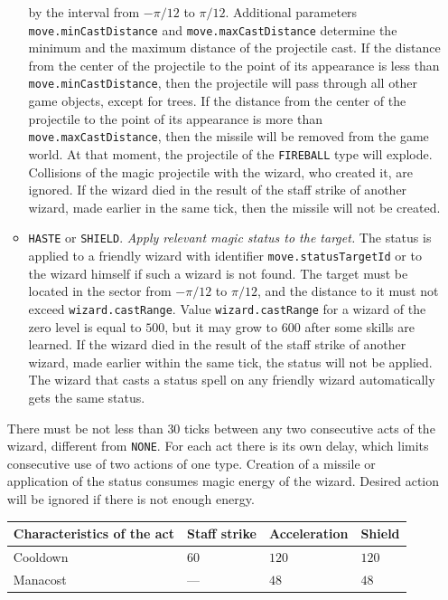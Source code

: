 \begin{itemize}
\begin{itemize}
                    by the interval from $-\pi / 12$ to $\pi / 12$. Additional parameters \texttt{move.minCastDistance} and
                    \texttt{move.maxCastDistance} determine the minimum and the maximum distance of the projectile cast. If the distance from the center
                    of the projectile to the point of its appearance is less than \texttt{move.minCastDistance}, then the projectile will pass through all
                    other game objects, except for trees. If the distance from the center of the projectile to the point of its appearance is more than
                    \texttt{move.maxCastDistance}, then the missile will be removed from the game world. At that moment, the projectile of the \texttt{FIREBALL} type will explode.
                    Collisions of the magic projectile with the wizard, who created it, are ignored. If the wizard died in the result of the staff strike
                    of another wizard, made earlier in the same tick, then the missile will not be created.
            \item \texttt{HASTE} or \texttt{SHIELD}. \textit{Apply relevant magic status to the target.} The status is applied to
                    a friendly wizard with identifier \texttt{move.statusTargetId} or to the wizard himself if such a wizard is not
                    found. The target must be located in the sector from $-\pi / 12$ to $\pi / 12$, and the distance to it must not exceed
                    \texttt{wizard.castRange}. Value \texttt{wizard.castRange} for a wizard of the zero level is equal to $500$, but it may
                    grow to $600$ after some skills are learned. If the wizard died in the result of the staff strike of another wizard,
                    made earlier within the same tick, the status will not be applied. The wizard that casts a status spell on any friendly wizard automatically gets the same status.
            \end{itemize}
 
            There must be not less than $30$ ticks between any two consecutive acts of the wizard, different from \texttt{NONE}. For each
            act there is its own delay, which limits consecutive use of two actions of one
            type. Creation of a missile or application of the status consumes magic energy of the wizard. Desired action will be ignored
            if there is not enough energy.
 
            \begin{tabular}{| l | l | l | l |}
            \hline
            Characteristics of the act & Staff strike & Acceleration & Shield   \\
            \hline
            Cooldown           & $60$          & $120$         & $120$ \\
            Manacost               & ---               & $48$          & $48$  \\
            \hline
            \end{tabular}
 

\end{itemize}

